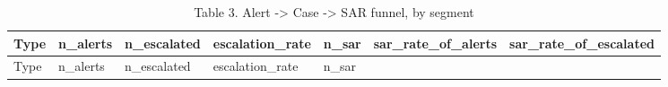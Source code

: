 \documentclass[
]{article}
\begin{document}
\begin{longtable}[]{@{}
  >{\raggedright\arraybackslash}p{}
  >{\raggedleft\arraybackslash}p{}
  >{\raggedleft\arraybackslash}p{}
  >{\raggedleft\arraybackslash}p{}
  >{\raggedleft\arraybackslash}p{}
  >{\raggedleft\arraybackslash}p{}
  >{\raggedleft\arraybackslash}p{}@{}}
\caption{Table 3. Alert -\textgreater{} Case -\textgreater{} SAR funnel,
by segment}\tabularnewline
\toprule\noalign{}
\begin{minipage}[b]{\linewidth}\raggedright
Type
\end{minipage} & \begin{minipage}[b]{\linewidth}\raggedleft
n\_alerts
\end{minipage} & \begin{minipage}[b]{\linewidth}\raggedleft
n\_escalated
\end{minipage} & \begin{minipage}[b]{\linewidth}\raggedleft
escalation\_rate
\end{minipage} & \begin{minipage}[b]{\linewidth}\raggedleft
n\_sar
\end{minipage} & \begin{minipage}[b]{\linewidth}\raggedleft
sar\_rate\_of\_alerts
\end{minipage} & \begin{minipage}[b]{\linewidth}\raggedleft
sar\_rate\_of\_escalated
\end{minipage} \\
\midrule\noalign{}
\endfirsthead
\toprule\noalign{}
\begin{minipage}[b]{\linewidth}\raggedright
Type
\end{minipage} & \begin{minipage}[b]{\linewidth}\raggedleft
n\_alerts
\end{minipage} & \begin{minipage}[b]{\linewidth}\raggedleft
n\_escalated
\end{minipage} & \begin{minipage}[b]{\linewidth}\raggedleft
escalation\_rate
\end{minipage} & \begin{minipage}[b]{\linewidth}\raggedleft
n\_sar

\end{minipage}
\end{longtable}
\end{document}
